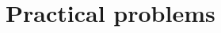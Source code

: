 \documentclass[a4paper,11pt]{article}
\begin{document}
\subsection{}
\section{Practical problems}
\subsection{}

\subsection{}
\end{document}
